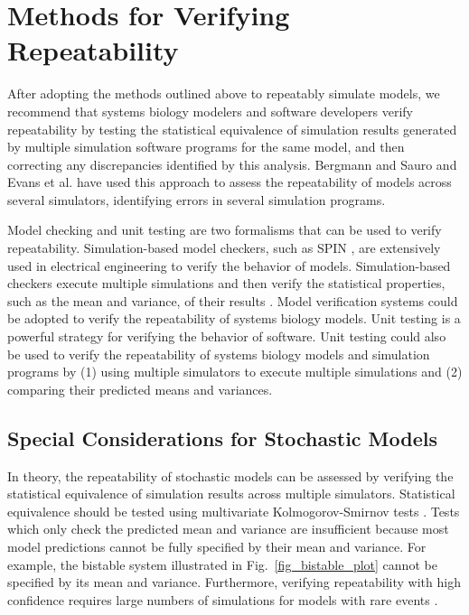 \documentclass[journal,transmag,twoside]{IEEEtran}
\begin{document}
\section{Methods for Verifying Repeatability}
After adopting the methods outlined above to repeatably simulate models, we recommend that systems biology modelers and software developers verify repeatability by testing the statistical equivalence of simulation results generated by multiple simulation software programs for the same model, and then correcting any discrepancies identified by this analysis. Bergmann and Sauro \cite{bergmann2008comparing} and Evans et al. \cite{evans2008sbml} have used this approach to assess the repeatability of models across several simulators, identifying errors in several simulation programs.

Model checking and unit testing are two formalisms that can be used to verify repeatability. Simulation-based model checkers, such as SPIN \cite{holzmann1997model}, are extensively used in electrical engineering to verify the behavior of models. Simulation-based checkers execute multiple simulations and then verify the statistical properties, such as the mean and variance, of their results \cite{kwiatkowska2011prism}. Model verification systems could be adopted to verify the repeatability of systems biology models. Unit testing is a powerful strategy for verifying the behavior of software. Unit testing could also be used to verify the repeatability of systems biology models and simulation programs by (1) using multiple simulators to execute multiple simulations and (2) comparing their predicted means and variances.

\subsection{Special Considerations for Stochastic Models}
In theory, the repeatability of stochastic models can be assessed by verifying the statistical equivalence of simulation results across multiple simulators. Statistical equivalence should be tested using multivariate Kolmogorov-Smirnov tests \cite{justel1997multivariate}. Tests which only check the predicted mean and variance are insufficient because most model predictions cannot be fully specified by their mean and variance. For example, the bistable system illustrated in Fig.~\ref{fig_bistable_plot} cannot be specified by its mean and variance. Furthermore, verifying repeatability with high confidence requires large numbers of simulations for models with rare events \cite{kim2013nonlinear}. 
\end{document}
